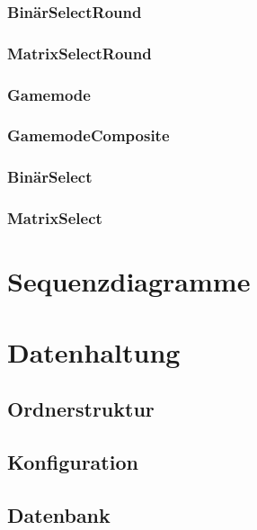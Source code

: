 \documentclass[a4paper]{scrreprt}
\begin{document}
   \subsection{BinärSelectRound}
   
   \subsection{MatrixSelectRound}
   
   
   \subsection{Gamemode}
   
   \subsection{GamemodeComposite}
   
   \subsection{BinärSelect}
   
   \subsection{MatrixSelect}
   

   
   
   
	

   \chapter{Sequenzdiagramme}

    \chapter{Datenhaltung}
        \section{Ordnerstruktur}
        \section{Konfiguration}
        \section{Datenbank}
\end{document}
